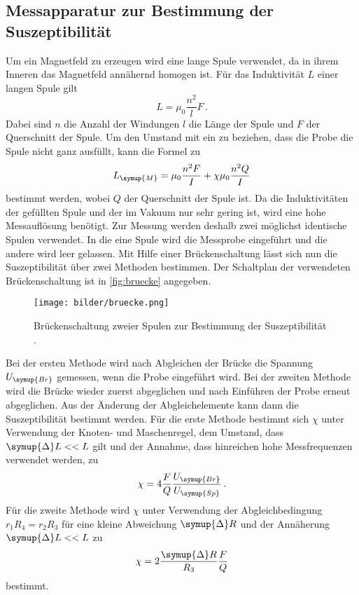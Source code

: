 \subsection{Messapparatur zur Bestimmung der Suszeptibilität}
\label{sec:Messapparatur}
Um ein Magnetfeld zu erzeugen wird eine lange Spule verwendet, da in ihrem Inneren das Magnetfeld annähernd homogen
ist. Für das Induktivität $L$ einer langen Spule gilt
\begin{equation*}
    L = \mu_{0}\frac{n^2}{l}F\,.
\end{equation*}
Dabei sind $n$ die Anzahl der Windungen $l$ die Länge der Spule und $F$ der Querschnitt der Spule. Um den Umstand
mit ein zu beziehen, dass die Probe die Spule nicht ganz ausfüllt, kann die Formel zu
\begin{equation}
    L_{\symup{M}} = \mu_{0}\frac{n^{2}F}{I}+\chi\mu_{0}\frac{n^{2}Q}{I}
\end{equation}
bestimmt werden, wobei $Q$ der Querschnitt der Spule ist. Da die Induktivitäten der gefüllten Spule und der im
Vakuum nur sehr gering ist, wird eine hohe Messauflösung benötigt. Zur Messung werden deshalb zwei
möglichst identische Spulen verwendet. In die eine Spule wird die Messprobe eingeführt und die andere wird leer
gelassen. Mit Hilfe einer Brückenschaltung lässt sich nun die Suszeptibilität über zwei Methoden bestimmen.
Der Schaltplan der verwendeten Brückenschaltung ist in \autoref{fig:bruecke} angegeben.
\begin{figure}
    \centering
    \texttt{[image: bilder/bruecke.png]}
    \caption{Brückenschaltung zweier Spulen zur Bestimmung der Suszeptibilität \cite{sample}.}
    \label{fig:bruecke}
\end{figure}
Bei der ersten Methode wird nach Abgleichen der Brücke die Spannung $U_{\symup{Br}}$ gemessen, wenn die Probe
eingeführt wird. Bei der zweiten Methode wird die Brücke wieder zuerst abgeglichen und nach Einführen der Probe
erneut abgeglichen. Aus der Änderung der Abgleichelemente kann dann die Suszeptibilität bestimmt werden.
Für die erste Methode bestimmt sich $\chi$ unter Verwendung der Knoten- und Maschenregel, dem Umstand,
dass $\symup{\Delta}L << L$ gilt und der Annahme, dass hinreichen hohe Messfrequenzen verwendet werden, zu
\begin{equation}
    \chi = 4\frac{F}{Q}\frac{U_{\symup{Br}}}{U_{\symup{Sp}}}\,.
\end{equation}
Für die zweite Methode wird $\chi$ unter Verwendung der Abgleichbedingung $r_{1}R_{4}=r_{2}R_{3}$ für eine kleine
Abweichung $\symup{\Delta}R$ und der Annäherung $\symup{\Delta}L << L$ zu
\begin{equation}
    \chi = 2 \frac{\symup{\Delta}R}{R_{3}}\frac{F}{Q}
\end{equation}
bestimmt.

